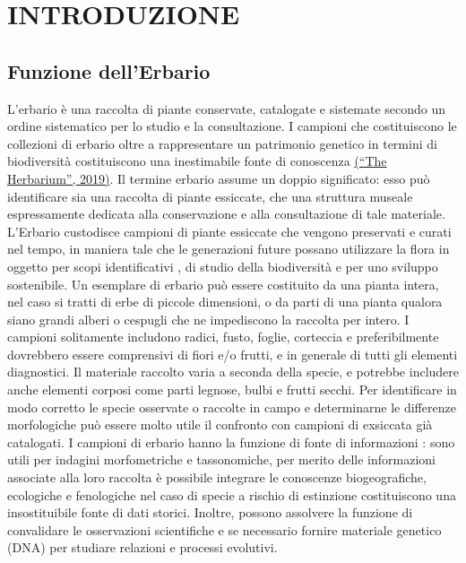 \documentclass[main.tex]{subfiles}
\begin{document}
\section{INTRODUZIONE}
\subsection{Funzione dell’Erbario}

L’erbario è una raccolta di piante conservate, catalogate e sistemate secondo un ordine sistematico per lo studio e la consultazione. I campioni che costituiscono le collezioni di erbario oltre a rappresentare un patrimonio genetico in termini di biodiversità costituiscono una inestimabile fonte di conoscenza \href{https://www.kew.org/science/collections-and-resources/collections/herbarium}{(“The Herbarium”, 2019)}.
Il termine erbario assume un doppio significato: esso può identificare sia una raccolta di piante essiccate, che una struttura museale espressamente dedicata alla conservazione e alla consultazione di tale materiale.
L'Erbario custodisce campioni di piante essiccate che vengono preservati e curati nel tempo, in maniera tale che le generazioni future possano utilizzare la flora in oggetto per scopi identificativi \citep{blunt}, di studio della biodiversità e per uno sviluppo sostenibile.
Un esemplare di erbario può essere costituito da una pianta intera, nel caso si tratti di erbe di piccole dimensioni, o da parti di una pianta qualora siano grandi alberi o cespugli che ne impediscono la raccolta per intero. I campioni solitamente includono radici, fusto, foglie, corteccia e preferibilmente dovrebbero essere comprensivi di fiori e/o frutti, e in generale di tutti gli elementi diagnostici. Il materiale raccolto varia a seconda della specie, e potrebbe includere anche elementi corposi come parti legnose, bulbi e frutti secchi.
Per identificare in modo corretto le specie osservate o raccolte in campo e determinarne le differenze morfologiche può essere molto utile il confronto con campioni di exsiccata già catalogati.
I campioni di erbario hanno la funzione di fonte di informazioni \citep{raf}: sono utili per indagini morfometriche e tassonomiche, per merito delle informazioni associate alla loro raccolta è possibile integrare le conoscenze biogeografiche, ecologiche e fenologiche nel caso di specie a rischio di estinzione costituiscono una insostituibile fonte di dati storici. Inoltre, possono assolvere la funzione di convalidare le osservazioni scientifiche e se necessario fornire materiale genetico (DNA) per studiare relazioni e processi evolutivi.
\end{document}
